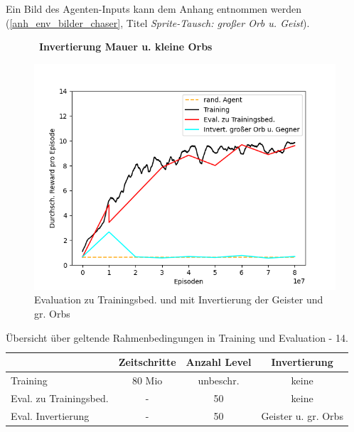 Ein Bild des Agenten-Inputs kann dem Anhang entnommen werden (\ref{anh_env_bilder_chaser}, Titel \emph{Sprite-Tausch: großer Orb u.
Geist}). 

\begin{figure}[htp!]
   \centering
   \captionsetup{width=0.60\linewidth} 
    \begin{minipage}{0.48\linewidth}
        \centering\
        \textbf{Invertierung Mauer u. kleine Orbs}\par\medskip
        \includegraphics[scale=0.5]{abb/_graphen/semChange_geistGrOrb_80Mio_15act_training_}
        \caption{Evaluation zu Trainingsbed. und mit Invertierung der Geister und gr. Orbs}
        \label{fig:semChange_geistGrOrb_80Mio_15act_training_}
    \end{minipage}
\end{figure}
\begin{center}
 \begin{table}[htp!]
 \begin{center}
  \begin{tabular}{ l c c c }
    \hline
		               			& Zeitschritte & Anzahl Level & 	 Invertierung\\ \hline
     Training              			& 80 Mio       & unbeschr.	    & 	 keine \\ \hline
     Eval. zu Trainingsbed.		& -	        	     & 50		    &	 keine \\ \hline
     Eval. Invertierung		 	& -	        	     & 50		    &	 Geister u. gr. Orbs \\ \hline
    \hline
  \end{tabular}
  \caption{Übersicht über geltende Rahmenbedingungen in Training und Evaluation - 14.}
  \label{tab:tab_durch_EXP_trainSetting13}
  \end{center}
 \end{table}
\end{center} 

